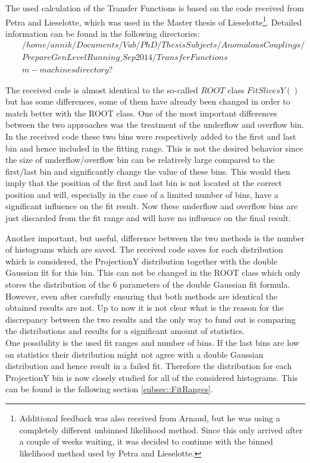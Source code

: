 The used calculation of the Transfer Functions is based on the code received from Petra and Lieselotte, which was used in the Master thesis of Lieselotte\footnote{Additional feedback was also received from Arnaud, but he was using a completely different unbinned likelihood method. Since this only arrived after a couple of weeks waiting, it was decided to continue with the binned likelihood method used by Petra and Lieselotte.}.%
Detailed information can be found in the following directories:
\begin{eqnarray*}
 & & /home/annik/Documents/Vub/PhD/ThesisSubjects/AnomalousCouplings/\\ 
 & & PrepareGenLevelRunning\_Sep2014/TransferFunctions \\
 & & m-machines directory?
\end{eqnarray*}

The received code is almost identical to the so-called $ROOT$ class $FitSlicesY()$ but has some differences, some of them have already been changed in order to match better with the ROOT class.
One of the most important differences between the two approaches was the treatment of the underflow and overflow bin. In the received code these two bins were respectively added to the first and last bin and hence included in the fitting range. This is not the desired behavior since the size of underflow/overflow bin can be relatively large compared to the first/last bin and significantly change the value of these bins. This would then imply that the position of the first and last bin is not located at the correct position and will, especially in the case of a limited number of bins, have a significant influence on the fit result.
Now these underflow and overflow bins are just discarded from the fit range and will have no influence on the final result.

Another important, but useful, difference between the two methods is the number of histograms which are saved. The received code saves for each distribution which is considered, the ProjectionY distribution together with the double Gaussian fit for this bin. This can not be changed in the ROOT class which only stores the distribution of the 6 parameters of the double Gaussian fit formula.\\

However, even after carefully ensuring that both methods are identical the obtained results are not.
Up to now it is not clear what is the reason for the discrepancy between the two results and the only way to fund out is comparing the distributions and results for a significant amount of statistics.\\
One possibility is the used fit ranges and number of bins. If the last bins are low on statistics their distribution might not agree with a double Gaussian distribution and hence result in a failed fit. Therefore the distribution for each ProjectionY bin is now closely studied for all of the considered histograms. This can be found is the following section \ref{subsec::FitRanges}.

